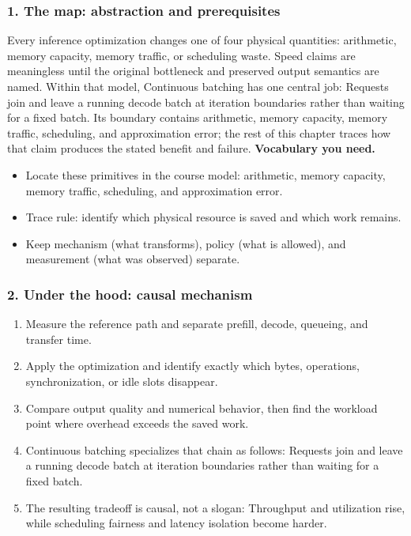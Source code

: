 \subsubsection*{1. The map: abstraction and prerequisites}
Every inference optimization changes one of four physical quantities: arithmetic, memory capacity, memory traffic, or scheduling waste. Speed claims are meaningless until the original bottleneck and preserved output semantics are named.
Within that model, Continuous batching has one central job: Requests join and leave a running decode batch at iteration boundaries rather than waiting for a fixed batch. Its boundary contains arithmetic, memory capacity, memory traffic, scheduling, and approximation error; the rest of this chapter traces how that claim produces the stated benefit and failure.
\textbf{Vocabulary you need.}\begin{itemize}
\item Locate these primitives in the course model: arithmetic, memory capacity, memory traffic, scheduling, and approximation error.
\item Trace rule: identify which physical resource is saved and which work remains.
\item Keep mechanism (what transforms), policy (what is allowed), and measurement (what was observed) separate.
\end{itemize}
\subsubsection*{2. Under the hood: causal mechanism}\begin{enumerate}
\item Measure the reference path and separate prefill, decode, queueing, and transfer time.
\item Apply the optimization and identify exactly which bytes, operations, synchronization, or idle slots disappear.
\item Compare output quality and numerical behavior, then find the workload point where overhead exceeds the saved work.
\item Continuous batching specializes that chain as follows: Requests join and leave a running decode batch at iteration boundaries rather than waiting for a fixed batch.
\item The resulting tradeoff is causal, not a slogan: Throughput and utilization rise, while scheduling fairness and latency isolation become harder.
\end{enumerate}

